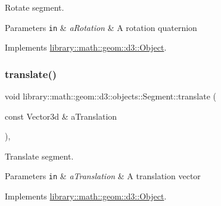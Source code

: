 Rotate segment. 


\begin{DoxyParams}[1]{Parameters}
\mbox{\tt in}  & {\em a\+Rotation} & A rotation quaternion \\
\hline
\end{DoxyParams}


Implements \hyperlink{classlibrary_1_1math_1_1geom_1_1d3_1_1_object_aabefebc4960530ce6356c4445c5d490e}{library\+::math\+::geom\+::d3\+::\+Object}.

\mbox{\label{classlibrary_1_1math_1_1geom_1_1d3_1_1objects_1_1_segment_a9a6b09a627c59fd2f2f3bd01a5afea22}} 
\subsubsection{\texorpdfstring{translate()}{translate()}}
{\footnotesize\ttfamily void library\+::math\+::geom\+::d3\+::objects\+::\+Segment\+::translate (\begin{DoxyParamCaption}\item[{const Vector3d \&}]{a\+Translation }\end{DoxyParamCaption})\hspace{0.3cm}{\ttfamily [override]}, {\ttfamily [virtual]}}



Translate segment. 


\begin{DoxyParams}[1]{Parameters}
\mbox{\tt in}  & {\em a\+Translation} & A translation vector \\
\hline
\end{DoxyParams}


Implements \hyperlink{classlibrary_1_1math_1_1geom_1_1d3_1_1_object_a989723a27a7d5f6739e45ea695a6c7ed}{library\+::math\+::geom\+::d3\+::\+Object}.

\mbox{\label{classlibrary_1_1math_1_1geom_1_1d3_1_1objects_1_1_segment_a3b2505e9553ba0067f8184120c106602}} 
